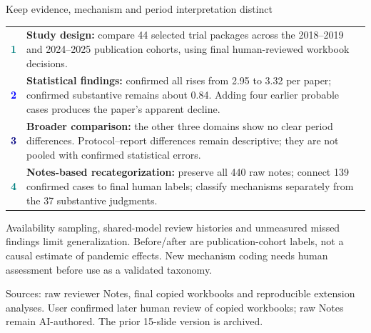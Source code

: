 \documentclass[10pt,aspectratio=169]{beamer}
\newcommand{\src}[1]{\par\vfill{\color{Slate}\fontsize{6.5}{8}\selectfont #1\par}}
\newcommand{\smalltext}{\fontsize{8.5}{10.4}\selectfont}
\begin{document}
\begin{frame}[t]{Keep evidence, mechanism and period interpretation distinct}
\begin{tabularx}{\linewidth}{@{}p{.55cm}Y@{}}
\textcolor{Teal}{\Large\textbf{1}} & \textbf{Study design:} compare 44 selected trial packages across the 2018--2019 and 2024--2025 publication cohorts, using final human-reviewed workbook decisions.\\[2mm]
\textcolor{Blue}{\Large\textbf{2}} & \textbf{Statistical findings:} confirmed all rises from 2.95 to 3.32 per paper; confirmed substantive remains about 0.84. Adding four earlier probable cases produces the paper's apparent decline.\\[2mm]
\textcolor{Navy}{\Large\textbf{3}} & \textbf{Broader comparison:} the other three domains show no clear period differences. Protocol--report differences remain descriptive; they are not pooled with confirmed statistical errors.\\[2mm]
\textcolor{Teal}{\Large\textbf{4}} & \textbf{Notes-based recategorization:} preserve all 440 raw notes; connect 139 confirmed cases to final human labels; classify mechanisms separately from the 37 substantive judgments.
\end{tabularx}
\medskip
\smalltext
Availability sampling, shared-model review histories and unmeasured missed findings limit generalization. Before/after are publication-cohort labels, not a causal estimate of pandemic effects. New mechanism coding needs human assessment before use as a validated taxonomy.
\src{Sources: raw reviewer Notes, final copied workbooks and reproducible extension analyses. User confirmed later human review of copied workbooks; raw Notes remain AI-authored. The prior 15-slide version is archived.}
\end{frame}
\end{document}
